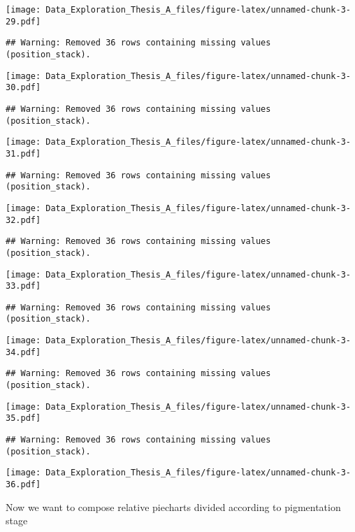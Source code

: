 \documentclass[]{article}
\begin{document}
\texttt{[image: Data\_Exploration\_Thesis\_A\_files/figure-latex/unnamed-chunk-3-29.pdf]}

\begin{verbatim}
## Warning: Removed 36 rows containing missing values (position_stack).
\end{verbatim}

\texttt{[image: Data\_Exploration\_Thesis\_A\_files/figure-latex/unnamed-chunk-3-30.pdf]}

\begin{verbatim}
## Warning: Removed 36 rows containing missing values (position_stack).
\end{verbatim}

\texttt{[image: Data\_Exploration\_Thesis\_A\_files/figure-latex/unnamed-chunk-3-31.pdf]}

\begin{verbatim}
## Warning: Removed 36 rows containing missing values (position_stack).
\end{verbatim}

\texttt{[image: Data\_Exploration\_Thesis\_A\_files/figure-latex/unnamed-chunk-3-32.pdf]}

\begin{verbatim}
## Warning: Removed 36 rows containing missing values (position_stack).
\end{verbatim}

\texttt{[image: Data\_Exploration\_Thesis\_A\_files/figure-latex/unnamed-chunk-3-33.pdf]}

\begin{verbatim}
## Warning: Removed 36 rows containing missing values (position_stack).
\end{verbatim}

\texttt{[image: Data\_Exploration\_Thesis\_A\_files/figure-latex/unnamed-chunk-3-34.pdf]}

\begin{verbatim}
## Warning: Removed 36 rows containing missing values (position_stack).
\end{verbatim}

\texttt{[image: Data\_Exploration\_Thesis\_A\_files/figure-latex/unnamed-chunk-3-35.pdf]}

\begin{verbatim}
## Warning: Removed 36 rows containing missing values (position_stack).
\end{verbatim}

\texttt{[image: Data\_Exploration\_Thesis\_A\_files/figure-latex/unnamed-chunk-3-36.pdf]}

Now we want to compose relative piecharts divided according to
pigmentation stage
\end{document}

